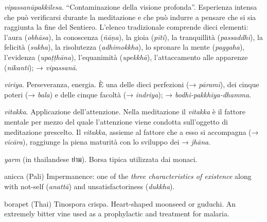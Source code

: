 \emph{vipassanūpakkilesa}. ``Contaminazione della visione profonda''.
Esperienza intensa che può verificarsi durante la meditazione e che può
indurre a pensare che si sia raggiunta la fine del Sentiero. L'elenco
tradizionale comprende dieci elementi: l'aura (\emph{obhāsa}), la
conoscenza (\emph{ñāṇa}), la gioia (\emph{pīti}), la tranquillità
(\emph{passaddhi}), la felicità (\emph{sukha}), la risolutezza
(\emph{adhimokkha}), lo spronare la mente (\emph{paggaha}), l'evidenza
(\emph{upaṭṭhāna}), l'equanimità (\emph{upekkhā}), l'attaccamento alle
apparenze (\emph{nikanti}); → \emph{vipassanā}.

\emph{viriya}. Perseveranza, energia. È una delle dieci perfezioni (→
\emph{pāramī}), dei cinque poteri (→ \emph{bala}) e delle cinque facoltà
(→ \emph{indriya}); → \emph{bodhi-pakkhiya-dhamma}.

\emph{vitakka}. Applicazione dell'attenzione. Nella meditazione il
\emph{vitakka} è il fattore mentale per mezzo del quale l'attenzione
viene condotta sull'oggetto di meditazione prescelto. Il \emph{vitakka},
assieme al fattore che a esso si accompagna (→ \emph{vicāra}), raggiunge
la piena maturità con lo sviluppo dei → \emph{jhāna}.

\emph{yarm} (in thailandese ย่าม). Borsa tipica utilizzata dai monaci.



\begin{glossarydescription}


\item[anicca] (Pali) Impermanence: one of the \emph{three characteristics of
    existence} along with not-self (\emph{anattā}) and unsatisfactoriness
  (\emph{dukkha}).


\item[borapet] (Thai) Tinospora crispa. Heart-shaped moonseed or guduchi.
  An extremely bitter vine used as a prophylactic and treatment for malaria.






















\end{glossarydescription}

